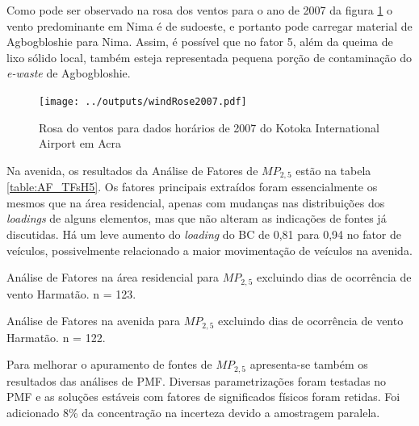Como pode ser observado na rosa dos ventos para o ano de 2007 
da figura \ref{fg:rosa2007} o vento predominante em Nima é de sudoeste, 
e portanto pode carregar material de Agbogbloshie para Nima. 
Assim, é possível que no fator 5, além da queima de lixo sólido local, 
também esteja representada pequena porção de contaminação do 
\textit{e-waste} de Agbogbloshie.

\begin{figure}[H]
  \centering
  \texttt{[image: ../outputs/windRose2007.pdf]}
  \caption{Rosa do ventos para dados horários de 2007 do 
           Kotoka International Airport em Acra 
           \label{fg:rosa2007}}
\end{figure}%


Na avenida, os resultados da Análise de Fatores de $MP_{2,5}$ estão na 
tabela \ref{table:AF_TFsH5}. Os fatores principais extraídos 
foram essencialmente os mesmos que na área residencial, apenas com mudanças nas
distribuições dos \textit{loadings} de alguns elementos, mas que não alteram 
as indicações de fontes já discutidas. Há um leve aumento do \textit{loading} 
do BC de 0,81 para 0,94 no fator de veículos, possivelmente relacionado a
maior movimentação de veículos na avenida.

\newpage
\begin{table}[H]
  \centering
  
  \caption{Análise de Fatores na área residencial para $MP_{2,5}$
           excluindo dias de ocorrência de vento Harmatão. n = 123.
          \label{table:AF_RFsH5}}
\end{table}

\begin{table}[H]
  \centering
  
  \caption{Análise de Fatores na avenida para $MP_{2,5}$
           excluindo dias de ocorrência de vento Harmatão. n = 122.
          \label{table:AF_TFsH5}}
\end{table}
\newpage

Para melhorar o apuramento de fontes de $MP_{2,5}$ apresenta-se também os
resultados das análises de PMF. Diversas parametrizações foram testadas no PMF 
e as soluções estáveis com fatores de significados físicos foram retidas. 
Foi adicionado 8\% da concentração na incerteza devido a amostragem paralela. 

